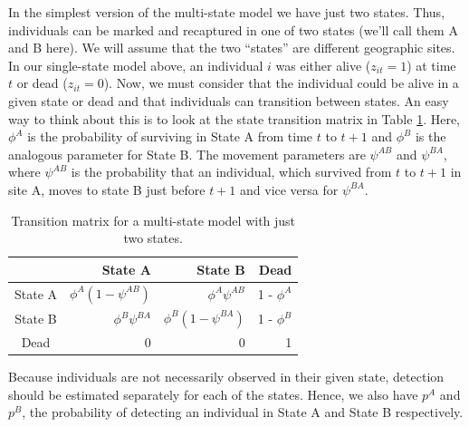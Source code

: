 In the simplest version of the multi-state model we have just two states.  Thus, individuals
can be marked and recaptured in one of two states (we'll call them A and B here).
We will assume that the two ``states'' are different
geographic sites.
In our single-state model above, an individual $i$ was either alive ($z_{it}=1$) at time $t$
or dead ($z_{it}=0$).  Now, we must consider that the individual could be alive in a given state or
dead and that individuals can transition between states.  An easy way to think about this is to look at
the state transition matrix in Table \ref{open.tab.CJSmulti-matrix}.
Here, $\phi^A$ 
is the probability of surviving
in State A from time $t$ to $t+1$ and $\phi^B$ is the analogous parameter for State B.  The
movement parameters are $\psi^{AB}$ and $\psi^{BA}$,
where $\psi^{AB}$ is the probability that an individual, which survived
from $t$ to $t+1$ in site A, moves to state B just
before $t+1$ and vice versa for $\psi^{BA}$.



\begin{table}[htb!]
\centering
\caption{
Transition matrix for a multi-state model with just two states.
}
\begin{tabular}{crrr}
\hline \hline
    &   State A &   State B   &   Dead \\  \hline
State A & $\phi^A(1-\psi^{AB})$ & $\phi^A \psi^{AB}$ & 1 - $\phi^A$ \\
State B & $\phi^B \psi^{BA}$ & $\phi^B(1-\psi^{BA})$ & 1 - $\phi^B$ \\
Dead & 0 & 0 & 1\\ \hline
\end{tabular}
\label{open.tab.CJSmulti-matrix}
\end{table}

Because individuals are not necessarily observed in their given state,
detection should be estimated separately for each of the states.
Hence, we also have $p^A$ and $p^B$, the probability of detecting an
individual in State A and State B respectively.

